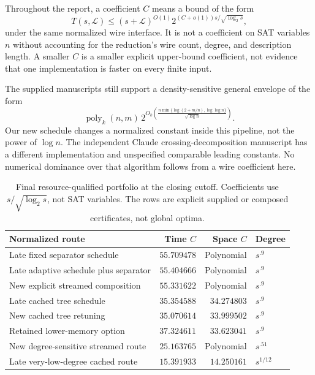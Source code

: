 \documentclass[11pt,letterpaper]{article}
\theoremstyle{remark}\newtheorem{remark}[theorem]{Remark}
\newcommand{\poly}{\operatorname{poly}}\newcommand{\vTwo}{v_2}\newcommand{\ceil}[1]{\left\lceil#1\right\rceil}\newcommand{\floor}[1]{\left\lfloor#1\right\rfloor}\newcommand{\LL}{\mathcal L}\newcommand{\Pin}{ab2fbc9e03d5c3d0ad6dec8686960bfe498b0b06}
\begin{document}
Throughout the report, a coefficient $C$ means a bound of the form
\begin{equation}\label{eq:scale}
 T(s,\LL)\le(s+\LL)^{O(1)}2^{(C+o(1))s/\sqrt{\log_2s}},
\end{equation}
under the same normalized wire interface. It is not a coefficient on SAT variables $n$ without accounting for the reduction's wire count, degree, and description length. A smaller $C$ is a smaller explicit upper-bound coefficient, not evidence that one implementation is faster on every finite input.

The supplied manuscripts still support a density-sensitive general envelope of the form
\begin{equation}\label{eq:sat-envelope}
 \poly_k(n,m)\,2^{O_k\!\left(\frac{n\min\{\log(2+m/n),\log\log n\}}{\sqrt{\log n}}\right)}.
\end{equation}
Our new schedule changes a normalized constant inside this pipeline, not the power of $\log n$. The independent Claude crossing-decomposition manuscript has a different implementation and unspecified comparable leading constants. No numerical dominance over that algorithm follows from a wire coefficient here.

\begin{table}[htbp]\centering\small
\begin{tabular}{@{}p{}rrl@{}}\toprule
Normalized route & Time $C$ & Space $C$ & Degree\\\midrule
Late fixed separator schedule & $55.709478$ & Polynomial & $s^{.9}$\\
Late adaptive schedule plus separator & $55.404666$ & Polynomial & $s^{.9}$\\
New explicit streamed composition & $55.331622$ & Polynomial & $s^{.9}$\\
Late cached tree schedule & $35.354588$ & $34.274803$ & $s^{.9}$\\
New cached tree retuning & $35.070614$ & $33.999502$ & $s^{.9}$\\
Retained lower-memory option & $37.324611$ & $33.623041$ & $s^{.9}$\\
New degree-sensitive streamed route & $25.163765$ & Polynomial & $s^{.51}$\\
Late very-low-degree cached route & $15.391933$ & $14.250161$ & $s^{1/12}$\\\bottomrule
\end{tabular}
\caption{Final resource-qualified portfolio at the closing cutoff. Coefficients
use $s/\sqrt{\log_2s}$, not SAT variables. The rows are explicit supplied or
composed certificates, not global optima.}
\end{table}
\end{document}
